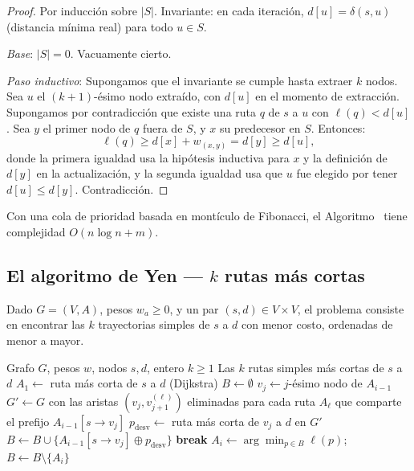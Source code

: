 \begin{proof}
Por inducción sobre $|S|$. Invariante: en cada iteración, $d[u] = \delta(s,u)$ (distancia mínima real) para todo $u \in S$.

\emph{Base}: $|S| = 0$. Vacuamente cierto.

\emph{Paso inductivo}: Supongamos que el invariante se cumple hasta extraer $k$ nodos. Sea $u$ el $(k+1)$-ésimo nodo extraído, con $d[u]$ en el momento de extracción. Supongamos por contradicción que existe una ruta $q$ de $s$ a $u$ con $\ell(q) < d[u]$. Sea $y$ el primer nodo de $q$ fuera de $S$, y $x$ su predecesor en $S$. Entonces:
\[
\ell(q) \geq d[x] + w_{(x,y)} = d[y] \geq d[u],
\]
donde la primera igualdad usa la hipótesis inductiva para $x$ y la definición de $d[y]$ en la actualización, y la segunda igualdad usa que $u$ fue elegido por tener $d[u] \leq d[y]$. Contradicción.
\end{proof}

\begin{proposition}
Con una cola de prioridad basada en montículo de Fibonacci, el Algoritmo~ tiene complejidad $O(n \log n + m)$.
\end{proposition}

\subsection{El algoritmo de Yen --- $k$ rutas más cortas}

\begin{definition}
Dado $G = (V,A)$, pesos $w_a \geq 0$, y un par $(s,d) \in V \times V$, el problema consiste en encontrar las $k$ trayectorias simples de $s$ a $d$ con menor costo, ordenadas de menor a mayor.
\end{definition}

\begin{algorithm}
\caption{Algoritmo de Yen (1971)}
\label{alg:yen}
\begin{algorithmic}[1]
\Require Grafo $G$, pesos $w$, nodos $s, d$, entero $k \geq 1$
\Ensure Las $k$ rutas simples más cortas de $s$ a $d$
\State $A_1 \leftarrow$ ruta más corta de $s$ a $d$ (Dijkstra)
\State $B \leftarrow \emptyset$ 
        \State $v_j \leftarrow j$-ésimo nodo de $A_{i-1}$
        \State $G' \leftarrow G$ con las aristas $(v_j, v_{j+1}^{(\ell)})$ eliminadas para cada ruta $A_\ell$ que comparte el prefijo $A_{i-1}[s \to v_j]$
        \State $p_{\mathrm{desv}} \leftarrow$ ruta más corta de $v_j$ a $d$ en $G'$
            \State $B \leftarrow B \cup \{A_{i-1}[s \to v_j] \oplus p_{\mathrm{desv}}\}$
        \EndIf
    \EndFor
        \State \textbf{break}
    \EndIf
    \State $A_i \leftarrow \arg\min_{p \in B} \ell(p)$; $B \leftarrow B \setminus \{A_i\}$
\EndFor
\end{algorithmic}
\end{algorithm}

